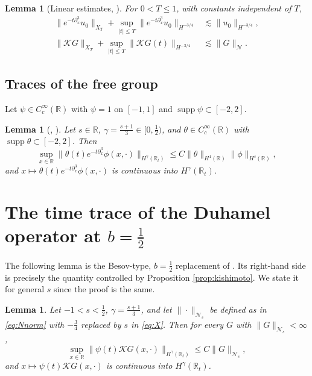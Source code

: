 \documentclass[10pt,reqno]{amsart}
\newtheorem{lemma}[theorem]{Lemma}
\theoremstyle{remark}
\numberwithin{equation}{section}
\newcommand{\R}{\mathbb R}
\newcommand{\pd}{\partial}
\newcommand{\ga}{\gamma}
\newcommand{\supp}{\operatorname{supp}}
\newcommand{\Kc}{\mathcal{K}}
\begin{document}
\begin{lemma}[Linear estimates, \cite{Kishimoto}]\label{lem:kishimoto-linear}
For $0<T\le1$, with constants independent of $T$,
\begin{align}
\|e^{-t\pd_x^3}u_0\|_{X_T}+\sup_{|t|\le T}\|e^{-t\pd_x^3}u_0\|_{H^{-3/4}}&\lesssim\|u_0\|_{H^{-3/4}},\label{eq:K41}\\
\|\Kc G\|_{X_T}+\sup_{|t|\le T}\|\Kc G(t)\|_{H^{-3/4}}&\lesssim\|G\|_{\mathcal N}.\label{eq:K42}
\end{align}
\end{lemma}

\subsection{Traces of the free group}
Let $\psi\in C_c^\infty(\R)$ with $\psi=1$ on $[-1,1]$ and $\supp\psi\subset[-2,2]$.

\begin{lemma}[\cite{KPV}, \cite{Holmer}]\label{lem:KPV}
Let $s\in\R$, $\ga=\frac{s+1}3\in[0,\frac12)$, and $\theta\in C_c^\infty(\R)$ with $\supp\theta\subset[-2,2]$. Then
$$\sup_{x\in\R}\|\theta(t)e^{-t\pd_x^3}\phi(x,\cdot)\|_{H^\ga(\R_t)}\le C\|\theta\|_{H^1(\R)}\|\phi\|_{H^s(\R)},$$
and $x\mapsto\theta(t)e^{-t\pd_x^3}\phi(x,\cdot)$ is continuous into $H^\ga(\R_t)$.
\end{lemma}

\section{The time trace of the Duhamel operator at $b=\frac12$}\label{sec:trace}

The following lemma is the Besov-type, $b=\frac12$ replacement of \cite[Lemma 5.6(b)]{Holmer}. Its right-hand side is precisely the quantity controlled by Proposition \ref{prop:kishimoto}. We state it for general $s$ since the proof is the same.

\begin{lemma}\label{lem:trace}
Let $-1<s<\frac12$, $\ga=\frac{s+1}3$, and let $\|\cdot\|_{\mathcal N_s}$ be defined as in \eqref{eq:Nnorm} with $-\frac34$ replaced by $s$ in \eqref{eq:X}. Then for every $G$ with $\|G\|_{\mathcal N_s}<\infty$,
$$\sup_{x\in\R}\|\psi(t)\Kc G(x,\cdot)\|_{H^\ga(\R_t)}\le C\|G\|_{\mathcal N_s},$$
and $x\mapsto\psi(t)\Kc G(x,\cdot)$ is continuous into $H^\ga(\R_t)$.
\end{lemma}
\end{document}
